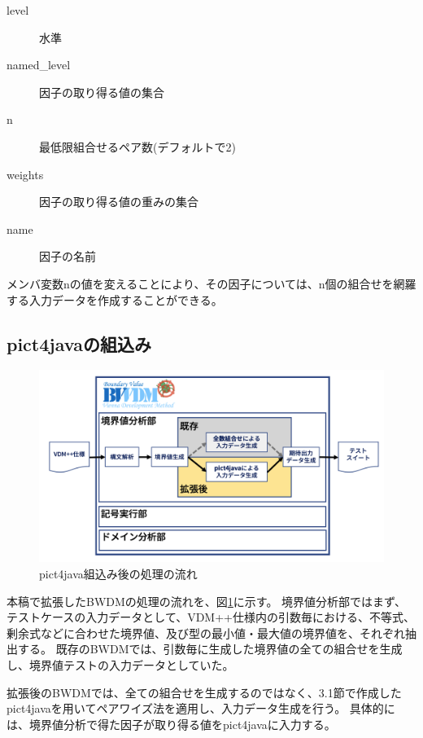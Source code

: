 \documentclass[uplatex, report, a4j, 10pt]{jsbook}
\begin{document}
\begin{itemize}
        \begin{description}
          \item[level] 水準
          \item[named\_level] 因子の取り得る値の集合
          \item[n] 最低限組合せるペア数(デフォルトで2)
          \item[weights] 因子の取り得る値の重みの集合
          \item[name] 因子の名前
        \end{description}
        メンバ変数nの値を変えることにより、その因子については、n個の組合せを網羅する入力データを作成することができる。
\end{itemize}

\subsection{pict4javaの組込み}
\begin{figure}[tp]
  \centering
  \includegraphics[keepaspectratio, width=160mm]{figs/pict4java_embed}
  \caption{pict4java組込み後の処理の流れ}
  \label{fig:pict4javaEmbed}
\end{figure}

本稿で拡張したBWDMの処理の流れを、図\ref{fig:pict4javaEmbed}に示す。
境界値分析部ではまず、テストケースの入力データとして、VDM++仕様内の引数毎における、不等式、剰余式などに合わせた境界値、及び型の最小値・最大値の境界値を、それぞれ抽出する。
既存のBWDMでは、引数毎に生成した境界値の全ての組合せを生成し、境界値テストの入力データとしていた。

拡張後のBWDMでは、全ての組合せを生成するのではなく、3.1節で作成したpict4javaを用いてペアワイズ法を適用し、入力データ生成を行う。
具体的には、境界値分析で得た因子が取り得る値をpict4javaに入力する。
\end{document}
